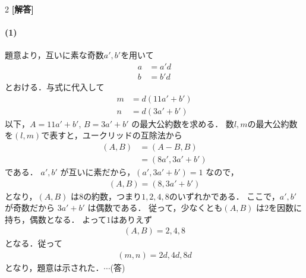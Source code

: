 \documentclass[../../main.tex]{subfiles}
\begin{document}
\setcounter{equation}{0}
\begin{oframed}
  
\end{oframed}
\setlength{\columnseprule}{0.4pt}
\begin{multicols}{2}
  {\bf [解答]}

  \paragraph{(1)}
  題意より，互いに素な奇数$a',b'$を用いて
  \begin{align}
    a & = a'd \\
    b & = b'd
  \end{align}
  とおける．与式に代入して
  \begin{align}
    m & = d(11a'+b') \\
    n & = d(3a'+b')
  \end{align}
  以下，$A=11a'+b'$, $B=3a'+b'$ の最大公約数を求める．
  数$l,m$の最大公約数を$(l,m)$で表すと，ユークリッドの互除法から
  \begin{align}
    (A,B)
    & =  (A-B,B)      \\
    & = (8a', 3a'+b')
  \end{align}
  である．
  $a', b'$ が互いに素だから，$(a', 3a'+b') = 1$ なので，
  \begin{align}
    (A,B) = (8,3a'+b')
  \end{align}
  となり，$(A,B)$ は$8$の約数，つまり$1,2,4,8$のいずれかである．
  ここで，$a',b'$が奇数だから $3a'+b'$ は偶数である．
  従って，少なくとも$(A,B)$ は$2$を因数に持ち，偶数となる．
  よって$1$はありえず
  \begin{align}
    (A,B) = 2,4,8
  \end{align}
  となる．従って
  \begin{align}
    (m,n) = 2d, 4d, 8d
  \end{align}
  となり，題意は示された．$\cdots$(答)


\end{multicols}
\end{document}
